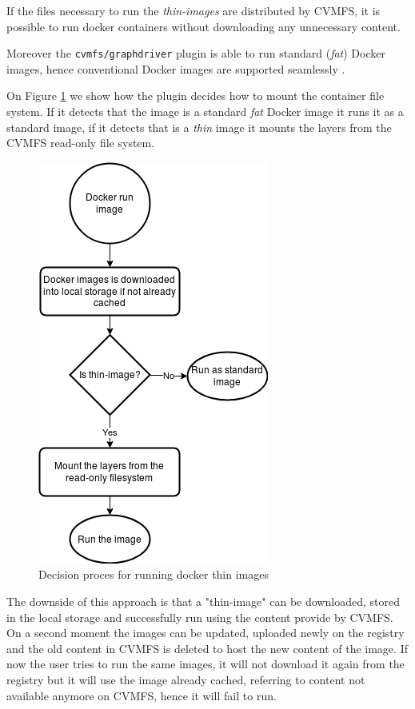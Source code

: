 If the files necessary to run the \textit{thin-images} are distributed by CVMFS, it is
possible to run docker containers without downloading any unnecessary content.

Moreover the \texttt{cvmfs/graphdriver} plugin is able to run standard (\textit{fat})
Docker images, hence conventional Docker images are supported seamlessly \cite{graphdriver-plugin}.

On Figure \ref{fig:flowchart-run-thin-image} we show how the plugin decides how
to mount the container file system. If it detects that the image is a standard
\textit{fat} Docker image it runs it as a standard image, if it detects that is a
\textit{thin} image it mounts the layers from the CVMFS read-only file system.

\begin{figure}
\begin{center}
\includegraphics[scale=0.5]{gfx/RunThinImages}
\end{center}
\caption{Decision proces for running docker thin images}
\label{fig:flowchart-run-thin-image}
\end{figure}

The downside of this approach is that a "thin-image" can be downloaded, stored in
the local storage and successfully run using the content provide by CVMFS. On a
second moment the images can be updated, uploaded newly on the registry and the
old content in CVMFS is deleted to host the new content of the image. If now
the user tries to run the same images, it will not download it again from the
registry but it will use the image already cached, referring
to content not available anymore on CVMFS, hence it will fail to run.

